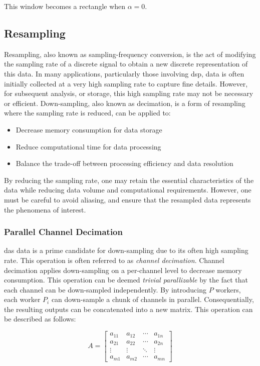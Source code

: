 This window becomes a rectangle when $\alpha = 0$.


\subsection{Resampling}

Resampling, also known as sampling-frequency conversion, is the act of modifying the sampling rate of a discrete signal to obtain a new discrete representation of this data. In many applications, particularly those involving \acrshort{dsp}, data is often initially collected at a very high sampling rate to capture fine details. However, for subsequent analysis, or storage, this high sampling rate may not be necessary or efficient. Down-sampling, also known as decimation, is a form of resampling where the sampling rate is reduced, can be applied to:

\begin{itemize}
    \item Decrease memory consumption for data storage
    \item Reduce computational time for data processing
    \item Balance the trade-off between processing efficiency and data resolution
\end{itemize}

By reducing the sampling rate, one may retain the essential characteristics of the data while reducing data volume and computational requirements. However, one must be careful to avoid aliasing, and ensure that the resampled data represents the phenomena of interest. 

\subsubsection{Parallel Channel Decimation}

\acrshort{das} data is a prime candidate for down-sampling due to its often high sampling rate. This operation is often referred to as \textit{channel decimation}. Channel decimation applies down-sampling on a per-channel level to decrease memory consumption. This operation can be deemed \textit{trivial parallizable} by the fact that each channel can be down-sampled independently. By introducing $P$ workers, each worker $P_i$ can down-sample a chunk of channels in parallel. Consequentially, the resulting outputs can be concatenated into a new matrix. This operation can be described as follows:

\[
A = \begin{bmatrix}
a_{11} & a_{12} & \cdots & a_{1n} \\
a_{21} & a_{22} & \cdots & a_{2n} \\
\vdots & \vdots & \ddots & \vdots \\
a_{m1} & a_{m2} & \cdots & a_{mn}
\end{bmatrix}
\]

